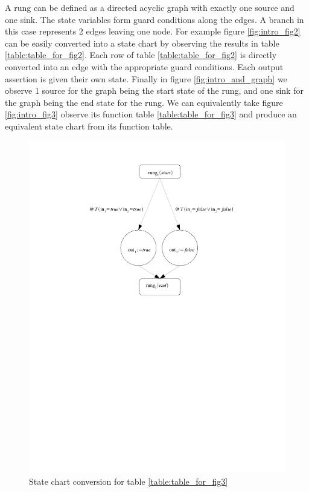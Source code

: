 A rung can be defined as a directed acyclic graph with exactly one source and one sink. The state variables form guard conditions along the edges. A branch in this case represents 2 edges leaving one node. For example figure \ref{fig:intro_fig2}
can be easily converted into a state chart by observing the results in table \ref{table:table_for_fig2}. 
Each row of table \ref{table:table_for_fig2} is directly converted into an edge with the appropriate guard conditions.
Each output assertion is given their own state. Finally in figure \ref{fig:intro_and_graph} we observe 1 source for the
graph being the start state of the rung, and one sink for the graph being the end state for the rung. We can equivalently take figure \ref{fig:intro_fig3} observe its function table \ref{table:table_for_fig3} and produce an equivalent state chart from its function table.

\pagebreak[3]

\begin{figure}[htp]
    \centering
    \includegraphics[trim= 50mm 140mm 50mm 10mm, clip ,width=\imgmedsmall]{./images/intro_or_graph.pdf} %
    \caption{State chart conversion for table \ref{table:table_for_fig3}}
    \label{fig:intro_or_graph}
\end{figure}

